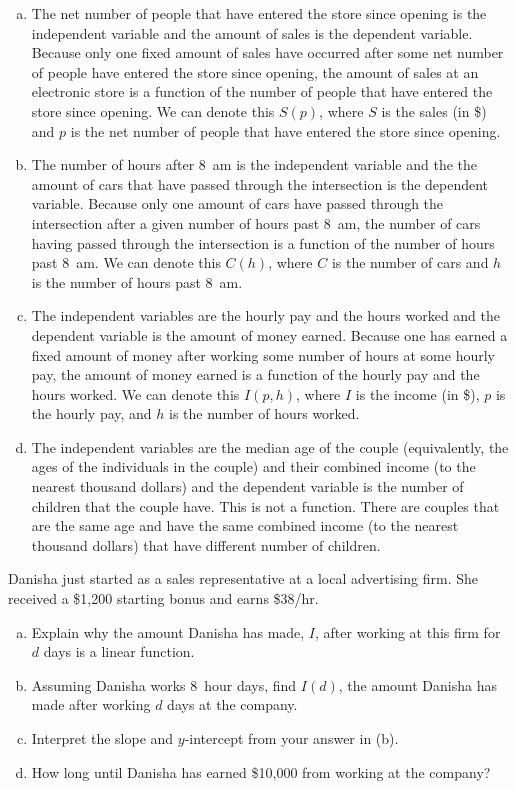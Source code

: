 \documentclass[11pt,letterpaper]{article}
\begin{document}
\sol
\begin{enumerate}[(a)]
\item The net number of people that have entered the store since opening is the independent variable and the amount of sales is the dependent variable. Because only one fixed amount of sales have occurred after some net number of people have entered the store since opening, the amount of sales at an electronic store is a function of the number of people that have entered the store since opening. We can denote this $S(p)$, where $S$ is the sales (in \$) and $p$ is the net number of people that have entered the store since opening. \pspace

\item The number of hours after 8~am is the independent variable and the the amount of cars that have passed through the intersection is the dependent variable. Because only one amount of cars have passed through the intersection after a given number of hours past 8~am, the number of cars having passed through the intersection is a function of the number of hours past 8~am. We can denote this $C(h)$, where $C$ is the number of cars and $h$ is the number of hours past 8~am. \pspace

\item The independent variables are the hourly pay and the hours worked and the dependent variable is the amount of money earned. Because one has earned a fixed amount of money after working some number of hours at some hourly pay, the amount of money earned is a function of the hourly pay and the hours worked. We can denote this $I(p, h)$, where $I$ is the income (in \$), $p$ is the hourly pay, and $h$ is the number of hours worked. \pspace

\item The independent variables are the median age of the couple (equivalently, the ages of the individuals in the couple) and their combined income (to the nearest thousand dollars) and the dependent variable is the number of children that the couple have. This is not a function. There are couples that are the same age and have the same combined income (to the nearest thousand dollars) that have different number of children. 
\end{enumerate}



\newpage



 Danisha just started as a sales representative at a local advertising firm. She received a \$1,200 starting bonus and earns \$38/hr. 
	\begin{enumerate}[(a)]
	\item Explain why the amount Danisha has made, $I$, after working at this firm for $d$ days is a linear function.
	\item Assuming Danisha works 8~hour days, find $I(d)$, the amount Danisha has made after working $d$ days at the company. 
	\item Interpret the slope and $y$-intercept from your answer in (b). 
	\item How long until Danisha has earned \$10,000 from working at the company?
	\end{enumerate} \pspace
\end{document}
